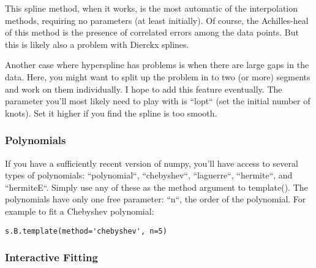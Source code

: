 This spline method, when it works, is the most automatic of the interpolation
methods, requiring no parameters (at least initially). Of course,
the Achilles-heal of this method is the presence of correlated errors
among the data points. But this is likely also a problem with Dierckx
splines.

Another case where hyperspline has problems is when there are large
gaps in the data. Here, you might want to split up the problem in
to two (or more) segments and work on them individually. I hope to
add this feature eventually. The parameter you'll most likely need
to play with is ``lopt`` (set the initial number of knots). Set
it higher if you find the spline is too smooth. 


\subsubsection{Polynomials}

If you have a sufficiently recent version of numpy, you'll have access
to several types of polynomials: ``polynomial``, ``chebyshev``,
``laguerre``, ``hermite``, and ``hermiteE``. Simply
use any of these as the method argument to template(). The polynomials
have only one free parameter: ``n``, the order of the polynomial.
For example to fit a Chebyshev polynomial:

\begin{verbatim}
s.B.template(method='chebyshev', n=5)
\end{verbatim}


\subsubsection{Interactive Fitting}

